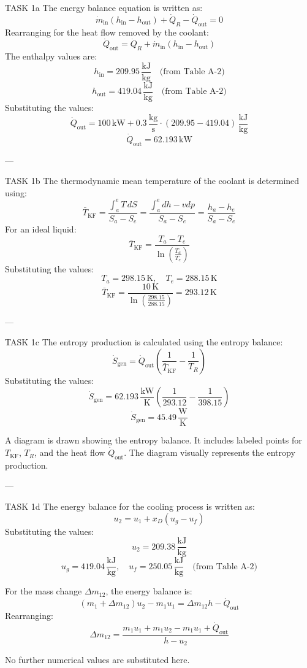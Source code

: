 TASK 1a  
The energy balance equation is written as:  
\[
\dot{m}_{\text{in}} (h_{\text{in}} - h_{\text{out}}) + \dot{Q}_R - \dot{Q}_{\text{out}} = 0
\]  
Rearranging for the heat flow removed by the coolant:  
\[
\dot{Q}_{\text{out}} = \dot{Q}_R + \dot{m}_{\text{in}} (h_{\text{in}} - h_{\text{out}})
\]  
The enthalpy values are:  
\[
h_{\text{in}} = 209.95 \, \frac{\text{kJ}}{\text{kg}} \quad \text{(from Table A-2)}
\]  
\[
h_{\text{out}} = 419.04 \, \frac{\text{kJ}}{\text{kg}} \quad \text{(from Table A-2)}
\]  
Substituting the values:  
\[
\dot{Q}_{\text{out}} = 100 \, \text{kW} + 0.3 \, \frac{\text{kg}}{\text{s}} \cdot (209.95 - 419.04) \, \frac{\text{kJ}}{\text{kg}}
\]  
\[
\dot{Q}_{\text{out}} = 62.193 \, \text{kW}
\]  

---

TASK 1b  
The thermodynamic mean temperature of the coolant is determined using:  
\[
\bar{T}_{\text{KF}} = \frac{\int_a^e T \, dS}{S_a - S_e} = \frac{\int_a^e dh - v dp}{S_a - S_e} = \frac{h_a - h_e}{S_a - S_e}
\]  
For an ideal liquid:  
\[
\bar{T}_{\text{KF}} = \frac{T_a - T_e}{\ln \left( \frac{T_a}{T_e} \right)}
\]  
Substituting the values:  
\[
T_a = 298.15 \, \text{K}, \quad T_e = 288.15 \, \text{K}
\]  
\[
\bar{T}_{\text{KF}} = \frac{10 \, \text{K}}{\ln \left( \frac{298.15}{288.15} \right)} = 293.12 \, \text{K}
\]  

---

TASK 1c  
The entropy production is calculated using the entropy balance:  
\[
\dot{S}_{\text{gen}} = \dot{Q}_{\text{out}} \left( \frac{1}{\bar{T}_{\text{KF}}} - \frac{1}{T_R} \right)
\]  
Substituting the values:  
\[
\dot{S}_{\text{gen}} = 62.193 \, \frac{\text{kW}}{\text{K}} \left( \frac{1}{293.12} - \frac{1}{398.15} \right)
\]  
\[
\dot{S}_{\text{gen}} = 45.49 \, \frac{\text{W}}{\text{K}}
\]  

A diagram is drawn showing the entropy balance. It includes labeled points for \( T_{\text{KF}} \), \( T_R \), and the heat flow \( \dot{Q}_{\text{out}} \). The diagram visually represents the entropy production.

---

TASK 1d  
The energy balance for the cooling process is written as:  
\[
u_2 = u_1 + x_D (u_g - u_f)
\]  
Substituting the values:  
\[
u_2 = 209.38 \, \frac{\text{kJ}}{\text{kg}}
\]  
\[
u_g = 419.04 \, \frac{\text{kJ}}{\text{kg}}, \quad u_f = 250.05 \, \frac{\text{kJ}}{\text{kg}} \quad \text{(from Table A-2)}
\]  

For the mass change \( \Delta m_{12} \), the energy balance is:  
\[
(m_1 + \Delta m_{12}) u_2 - m_1 u_1 = \Delta m_{12} h - \dot{Q}_{\text{out}}
\]  
Rearranging:  
\[
\Delta m_{12} = \frac{m_1 u_1 + m_1 u_2 - m_1 u_1 + \dot{Q}_{\text{out}}}{h - u_2}
\]  

No further numerical values are substituted here.
